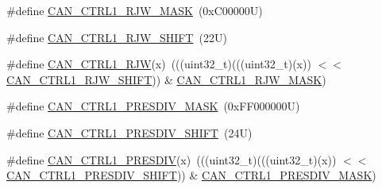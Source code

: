 \begin{DoxyCompactItemize}
\item 
\#define \mbox{\hyperlink{group___c_a_n___register___masks_ga10512d44b72e4fcf8fff8052dba9fd3a}{C\+A\+N\+\_\+\+C\+T\+R\+L1\+\_\+\+R\+J\+W\+\_\+\+M\+A\+SK}}~(0x\+C00000\+U)
\item 
\#define \mbox{\hyperlink{group___c_a_n___register___masks_ga6fbcc0f866380f763269138136a2a92e}{C\+A\+N\+\_\+\+C\+T\+R\+L1\+\_\+\+R\+J\+W\+\_\+\+S\+H\+I\+FT}}~(22\+U)
\item 
\#define \mbox{\hyperlink{group___c_a_n___register___masks_gaa54623c269b62894c35c88d10102f17b}{C\+A\+N\+\_\+\+C\+T\+R\+L1\+\_\+\+R\+JW}}(x)~(((uint32\+\_\+t)(((uint32\+\_\+t)(x)) $<$$<$ \mbox{\hyperlink{group___c_a_n___register___masks_ga6fbcc0f866380f763269138136a2a92e}{C\+A\+N\+\_\+\+C\+T\+R\+L1\+\_\+\+R\+J\+W\+\_\+\+S\+H\+I\+FT}})) \& \mbox{\hyperlink{group___c_a_n___register___masks_ga10512d44b72e4fcf8fff8052dba9fd3a}{C\+A\+N\+\_\+\+C\+T\+R\+L1\+\_\+\+R\+J\+W\+\_\+\+M\+A\+SK}})
\item 
\#define \mbox{\hyperlink{group___c_a_n___register___masks_gad8d384c87d48a3fc0b1ae52949823818}{C\+A\+N\+\_\+\+C\+T\+R\+L1\+\_\+\+P\+R\+E\+S\+D\+I\+V\+\_\+\+M\+A\+SK}}~(0x\+F\+F000000\+U)
\item 
\#define \mbox{\hyperlink{group___c_a_n___register___masks_ga762ed1bd89d4db4a6f34a12f8ae0afcf}{C\+A\+N\+\_\+\+C\+T\+R\+L1\+\_\+\+P\+R\+E\+S\+D\+I\+V\+\_\+\+S\+H\+I\+FT}}~(24\+U)
\item 
\#define \mbox{\hyperlink{group___c_a_n___register___masks_ga984ade68da6423e2afc012f0979221d7}{C\+A\+N\+\_\+\+C\+T\+R\+L1\+\_\+\+P\+R\+E\+S\+D\+IV}}(x)~(((uint32\+\_\+t)(((uint32\+\_\+t)(x)) $<$$<$ \mbox{\hyperlink{group___c_a_n___register___masks_ga762ed1bd89d4db4a6f34a12f8ae0afcf}{C\+A\+N\+\_\+\+C\+T\+R\+L1\+\_\+\+P\+R\+E\+S\+D\+I\+V\+\_\+\+S\+H\+I\+FT}})) \& \mbox{\hyperlink{group___c_a_n___register___masks_gad8d384c87d48a3fc0b1ae52949823818}{C\+A\+N\+\_\+\+C\+T\+R\+L1\+\_\+\+P\+R\+E\+S\+D\+I\+V\+\_\+\+M\+A\+SK}})
\end{DoxyCompactItemize}
